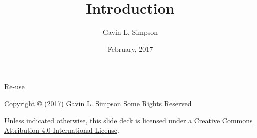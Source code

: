 \documentclass[10pt,ignorenonframetext,compress, aspectratio=169]{beamer}
\title{Introduction}
\author{Gavin L. Simpson}
\date{February, 2017}
\begin{document}
\frame{\titlepage}

\begin{frame}{Re-use}

Copyright © (2017) Gavin L. Simpson Some Rights Reserved

Unless indicated otherwise, this slide deck is licensed under a
\href{http://creativecommons.org/licenses/by/4.0/}{Creative Commons
Attribution 4.0 International License}.

\begin{center}
  \ccby
\end{center}

\end{frame}
\end{document}
